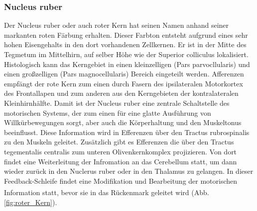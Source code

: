 \documentclass[12pt,a4paper,pdftex]{article}
\begin{document}
\subsubsection*{Nucleus ruber} 
Der Nucleus ruber oder auch roter Kern hat seinen Namen anhand seiner markanten roten Färbung erhalten. Dieser Farbton entsteht aufgrund eines sehr hohen Eisengehalts in den dort vorhandenen Zellkernen. Er ist in der Mitte des Tegmetum im Mittelhirn, auf selber Höhe wie der Superior colliculus lokalisiert. Histologisch kann das Kerngebiet in einen kleinzelligen (Pars parvocllularis) und einen großzelligen (Pars magnocellularis) Bereich eingeteilt werden. Afferenzen empfängt der rote Kern zum einen durch Fasern des ipsilateralen Motorkortex des Frontallapen und zum anderen aus den Kerngebieten der kontralateralen Kleinhirnhälfte. Damit ist der Nucleus ruber eine zentrale Schaltstelle des motorischen Systems, der zum einen für eine glatte Ausführung von Willkürbewegungen sorgt, aber auch die Körperhaltung und den Muskeltonus beeinflusst. Diese Information wird in Efferenzen über den Tractus rubrospinalis zu den Muskeln geleitet. Zusätzlich gibt es Efferenzen die über den Tractus tegementalis centralis zum unteren Olivenkernkomplex projizieren. Von dort findet eine Weiterleitung der Infromation an das Cerebellum statt, um dann wieder zurück in den Nuclerus ruber oder in den Thalamus zu gelangen. In dieser Feedback-Schleife findet eine Modifikation und Bearbeitung der motorischen Information statt, bevor sie in das Rückenmark geleitet wird \textsuperscript{\cite[6]{trepel2011neuroanatomie}} (Abb. \ref{fig:roter_Kern}). 
\end{document}
